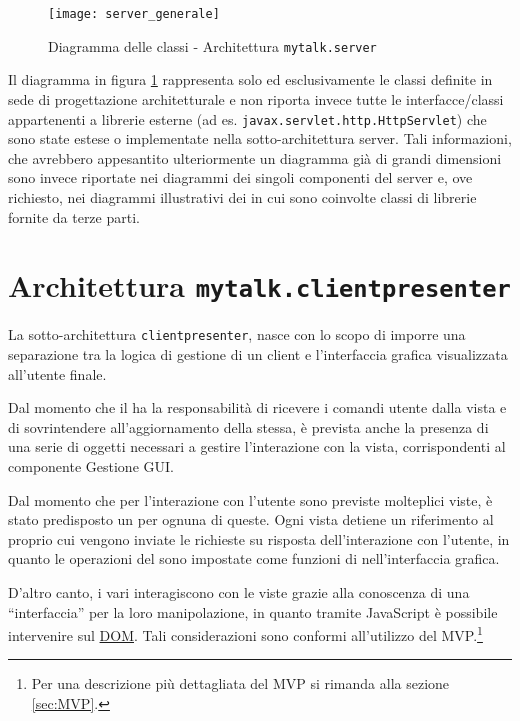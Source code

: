\begin{figure}[H]
  \centering
  \texttt{[image: server\_generale]}
  \caption{Diagramma delle classi - Architettura \texttt{mytalk.server}}\label{fig:sottoarchserver}
\end{figure}

Il diagramma in figura \ref{fig:sottoarchserver} rappresenta solo ed esclusivamente le classi definite in sede di progettazione architetturale e non riporta invece tutte le interfacce/classi appartenenti a librerie esterne (ad es. \texttt{javax.servlet.http.HttpServlet}) che sono state estese o implementate nella sotto-architettura server. Tali informazioni, che avrebbero appesantito ulteriormente un diagramma già di grandi dimensioni sono invece riportate nei diagrammi dei singoli componenti del server e, ove richiesto, nei diagrammi illustrativi dei  in cui sono coinvolte classi di librerie fornite da terze parti.
\clearpage


\section{Architettura \texttt{mytalk.clientpresenter}}\label{sec:clientpresenter}
La sotto-architettura \texttt{clientpresenter}, nasce con lo scopo di imporre una separazione tra la logica di gestione di un client e l'interfaccia grafica visualizzata all'utente finale.

Dal momento che il  ha la responsabilità di ricevere i comandi utente dalla vista e di sovrintendere all'aggiornamento della stessa, è prevista anche la presenza di una serie di oggetti necessari a gestire l'interazione con la vista, corrispondenti al componente \textsf{Gestione GUI}\@.

Dal momento che per l'interazione con l'utente sono previste molteplici viste, è stato predisposto un  per ognuna di queste. Ogni vista detiene un riferimento al proprio  cui vengono inviate le richieste su risposta dell'interazione con l'utente, in quanto le operazioni del  sono impostate come funzioni di  nell'interfaccia grafica.

D'altro canto, i vari  interagiscono con le viste grazie alla conoscenza di una ``interfaccia'' per la loro manipolazione, in quanto tramite JavaScript è possibile intervenire sul \underline{DOM}\@. Tali considerazioni sono conformi all'utilizzo del  MVP.\footnote{%
  Per una descrizione più dettagliata del  MVP si rimanda alla sezione \ref{sec:MVP}\@.
}

